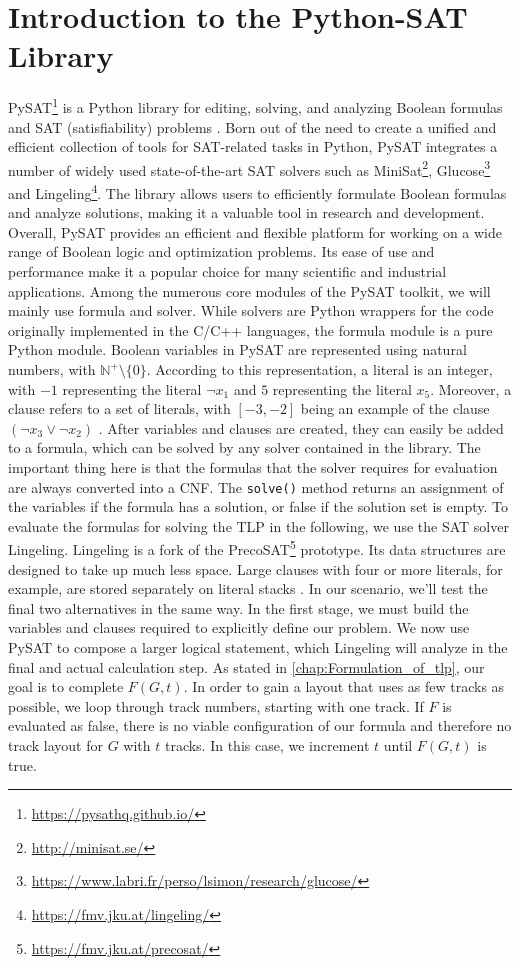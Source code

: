 \documentclass[bachelor, english]{algothesis}
\begin{document}
\section{Introduction to the Python-SAT Library}
PySAT\footnote{\url{https://pysathq.github.io/}} is a Python library for editing, solving, and analyzing Boolean formulas and SAT (satisfiability) problems \cite{PySAT}. Born out of the need to create a unified and efficient collection of tools for SAT-related tasks in Python, PySAT integrates a number of widely used state-of-the-art SAT solvers such as MiniSat\footnote{\url{http://minisat.se/}}, Glucose\footnote{\url{https://www.labri.fr/perso/lsimon/research/glucose/}} and Lingeling\footnote{\url{https://fmv.jku.at/lingeling/}}. The library allows users to efficiently formulate Boolean formulas and analyze solutions, making it a valuable tool in research and development. Overall, PySAT provides an efficient and flexible platform for working on a wide range of Boolean logic and optimization problems. Its ease of use and performance make it a popular choice for many scientific and industrial applications. \newline
Among the numerous core modules of the PySAT toolkit, we will mainly use formula and solver. While solvers are Python wrappers for the code originally implemented in the C/C++ languages, the formula module is a pure Python module. Boolean variables in PySAT are represented using natural numbers, with $\mathbb{N}^+\setminus\{0\}$. According to this representation, a literal is an integer, with $-1$ representing the literal $\lnot x_1$ and $5$ representing the literal $x_5$. Moreover, a clause refers to a set of literals, with $[-3, -2]$ being an example of the clause $(\lnot x_3 \lor \lnot x_2)$ \cite{PySAT}. After variables and clauses are created, they can easily be added to a formula, which can be solved by any solver contained in the library. The important thing here is that the formulas that the solver requires for evaluation are always converted into a CNF. The \texttt{solve()} method returns an assignment of the variables if the formula has a solution, or false if the solution set is empty. \newline
To evaluate the formulas for solving the TLP in the following, we use the SAT solver Lingeling. Lingeling is a fork of the PrecoSAT\footnote{\url{https://fmv.jku.at/precosat/}} prototype. Its data structures are designed to take up much less space. Large clauses with four or more literals, for example, are stored separately on literal stacks \cite{LingeLing}. In our scenario, we'll test the final two alternatives in the same way. In the first stage, we must build the variables and clauses required to explicitly define our problem. We now use PySAT to compose a larger logical statement, which Lingeling will analyze in the final and actual calculation step. As stated in \cref{chap:Formulation_of_tlp}, our goal is to complete $F(G,t)$. In order to gain a layout that uses as few tracks as possible, we loop through track numbers, starting with one track. If $F$ is evaluated as false, there is no viable configuration of our formula and therefore no track layout for $G$ with $t$ tracks. In this case, we increment $t$ until $F(G,t)$ is true. 
\end{document}
